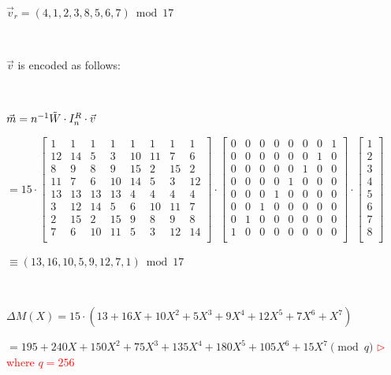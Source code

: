 $\vec{v}_r = (4, 1, 2, 3, 8, 5, 6, 7) \bmod 17$

$ $

$\vec{v}$ is encoded as follows:

$ $

$\vec{m} = n^{-1} \tilde{W} \cdot I_n^R \cdot \vec{v} $

$= 15 \cdot  \begin{bmatrix}
1 & 1 & 1 & 1 & 1 & 1 & 1 & 1\\
12&14&5&3&10&11&7&6\\
8&9&8&9&15&2&15&2\\
11&7&6&10&14&5&3&12\\
13&13&13&13&4&4&4&4\\
3&12&14&5&6&10&11&7\\
2&15&2&15&9&8&9&8\\
7&6&10&11&5&3&12&14\\
\end{bmatrix} \cdot \begin{bmatrix}
0 & 0 & 0 & 0 & 0 & 0 & 0 & 1\\
0 & 0 & 0 & 0 & 0 & 0 & 1 & 0\\
0 & 0 & 0 & 0 & 0 & 1 & 0 & 0\\
0 & 0 & 0 & 0 & 1 & 0 & 0 & 0\\
0 & 0 & 0 & 1 & 0 & 0 & 0 & 0\\
0 & 0 & 1 & 0 & 0 & 0 & 0 & 0\\
0 & 1 & 0 & 0 & 0 & 0 & 0 & 0\\
1 & 0 & 0 & 0 & 0 & 0 & 0 & 0\\
\end{bmatrix} \cdot \begin{bmatrix}
1\\
2\\
3\\
4\\
5\\
6\\
7\\
8\\
\end{bmatrix}$

$ \equiv (13, 16, 10, 5, 9, 12, 7, 1)  \bmod 17$


$ $

$\Delta M(X) = 15\cdot(13 + 16X + 10X^2 + 5X^3 + 9X^4 + 12X^5 + 7X^6 + X^7)$


$ = 195 + 240X + 150X^2 + 75X^3 + 135X^4 + 180X^5 + 105X^6 + 15X^7 \pmod{q}$ \textcolor{red}{  $\rhd$ where $q = 256$}

$ $

